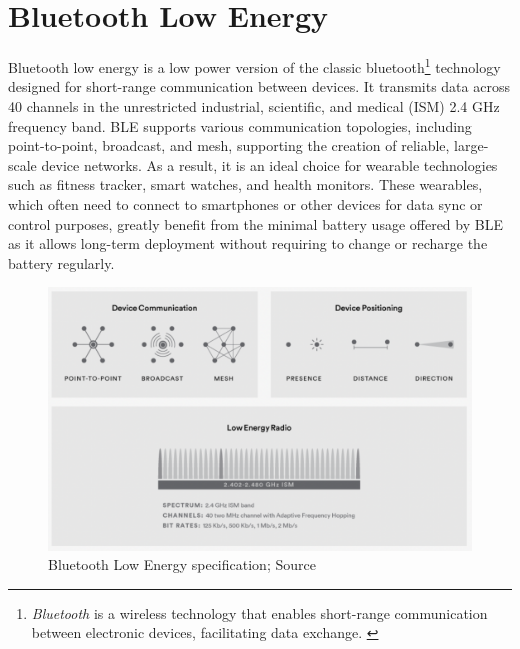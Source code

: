 \section{Bluetooth Low Energy}
Bluetooth low energy is a low power version of the classic bluetooth\footnote{\emph{Bluetooth} is a wireless technology that enables short-range communication between electronic devices, facilitating data exchange. \autocite{bluetooth_tech_overview}} technology designed for short-range communication between devices.
It transmits data across 40 channels in the unrestricted industrial, scientific, and medical (ISM) 2.4 GHz frequency band.
BLE supports various communication topologies, including point-to-point, broadcast, and mesh, supporting the creation of reliable, large-scale device networks. 
As a result, it is an ideal choice for wearable technologies such as fitness tracker, smart watches, and health monitors. \autocite{bluetooth_tech_overview}
These wearables, which often need to connect to smartphones or other devices for data sync or control purposes, greatly benefit from the minimal battery usage offered by BLE as it allows long-term deployment without requiring to change or recharge the battery regularly. \autocite{strey2013ble}

\begin{figure}[H]
    \centering
    \includegraphics[width=1\textwidth]{images/ble.png}
    \caption{Bluetooth Low Energy specification; Source \autocite{bluetooth_tech_overview}}
\end{figure}